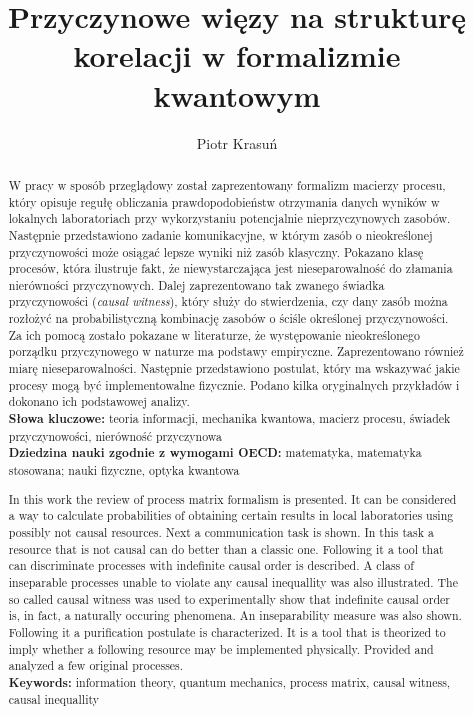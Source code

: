 \documentclass[10pt]{article} %
\title{Przyczynowe więzy na strukturę korelacji w formalizmie kwantowym}
\author{Piotr Krasuń}
\begin{document}
\clearpage


\clearpage
{}
\begin{abstract}
W pracy w sposób przeglądowy został zaprezentowany formalizm macierzy procesu, który opisuje regułę obliczania prawdopodobieństw otrzymania danych wyników w lokalnych laboratoriach przy wykorzystaniu potencjalnie nieprzyczynowych zasobów. Następnie przedstawiono zadanie komunikacyjne, w którym zasób o nieokreślonej przyczynowości może osiągać lepsze wyniki niż zasób klasyczny. Pokazano klasę procesów, która ilustruje fakt, że niewystarczająca jest nieseparowalność do złamania nierówności przyczynowych. Dalej zaprezentowano tak zwanego świadka przyczynowości (\textit{causal witness}), który służy do stwierdzenia, czy dany zasób można rozłożyć na probabilistyczną kombinację zasobów o ściśle określonej przyczynowości. Za ich pomocą zostało pokazane w literaturze, że występowanie nieokreślonego porządku przyczynowego w naturze ma podstawy empiryczne. Zaprezentowano również miarę nieseparowalności. Następnie przedstawiono postulat, który ma wskazywać jakie procesy mogą być implementowalne fizycznie. Podano kilka oryginalnych przykładów i dokonano ich podstawowej analizy.\\
\textbf{Słowa kluczowe:} teoria informacji, mechanika kwantowa, macierz procesu, świadek przyczynowości, nierówność przyczynowa\\
\textbf{Dziedzina nauki zgodnie z wymogami OECD:} matematyka, matematyka stosowana; nauki fizyczne, optyka kwantowa
\end{abstract}

\newpage
\renewcommand{\abstractname}{Abstract}
\begin{abstract}
In this work the review of process matrix formalism is presented. It can be considered a way to calculate probabilities of obtaining certain results in local laboratories using possibly not causal resources. Next a communication task is shown. In this task a resource that is not causal can do better than a classic one. Following it a tool that can discriminate processes with indefinite causal order is described. A class of inseparable processes unable to violate any causal inequallity was also illustrated. The so called causal witness was used to experimentally show that indefinite causal order is, in fact, a naturally occuring phenomena. An inseparability measure was also shown. Following it a purification postulate is characterized. It is a tool that is theorized to imply whether a following resource may be implemented physically. Provided and analyzed a few original processes.\\
\textbf{Keywords:} information theory, quantum mechanics, process matrix, causal witness, causal inequallity
\end{abstract}
\newpage
\newpage
\tableofcontents
\newpage
\end{document}
